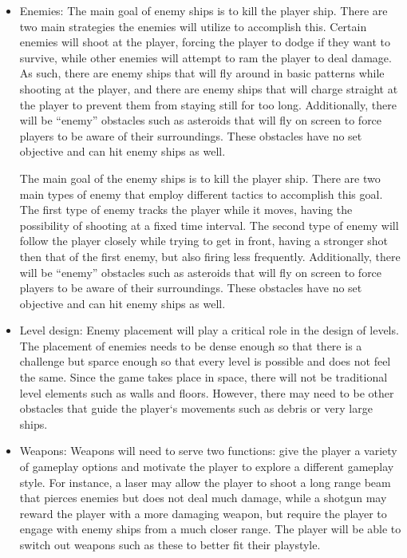 \documentclass[12pt]{article}       %
\begin{document}
\begin{itemize}
\item Enemies: The main goal of enemy ships is to kill the player ship. There are two main strategies the enemies will utilize to accomplish this. Certain enemies will shoot at the player, forcing the player to dodge if they want to survive, while other enemies will attempt to ram the player to deal damage. As such, there are enemy ships that will fly around in basic patterns while shooting at the player, and there are enemy ships that will charge straight at the player to prevent them from staying still for too long. Additionally, there will be “enemy” obstacles such as asteroids that will fly on screen to force players to be aware of their surroundings. These obstacles have no set objective and can hit enemy ships as well.

The main goal of the enemy ships is to kill the player ship. There are two main types of enemy that employ different tactics to accomplish this goal. The first type of enemy tracks the player while it moves, having the possibility of shooting at a fixed time interval. The second type of enemy will follow the player closely while trying to get in front, having a stronger shot then that of the first enemy, but also firing less frequently. Additionally, there will be “enemy” obstacles such as asteroids that will fly on screen to force players to be aware of their surroundings. These obstacles have no set objective and can hit enemy ships as well.

\item Level design: Enemy placement will play a critical role in the design of levels. The placement of enemies needs to be dense enough so that there is a challenge but  sparce enough so that every level is possible and does not feel the same. Since the game takes place in space, there will not be traditional level elements such as walls and floors. However, there may need to be other obstacles that guide the player‘s movements such as debris or very large ships.

\item Weapons: Weapons will need to serve two functions: give the player a variety of gameplay options and motivate the player to explore a different gameplay style. For instance, a laser may allow the player to shoot a long range beam that pierces enemies but does not deal much damage, while a shotgun may reward the player with a more damaging weapon, but require the player to engage with enemy ships from a much closer range. The player will be able to switch out weapons such as these to better fit their playstyle.


\end{itemize}
\end{document}
